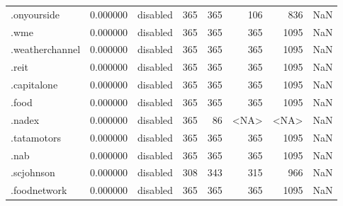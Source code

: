 \begin{tabular}{lrlrrrrl}
.onyourside               &          0.000000 &        disabled &                         365 &                         365 &                         106 &                 836 &                  NaN \\
.wme                      &          0.000000 &        disabled &                         365 &                         365 &                         365 &                1095 &                  NaN \\
.weatherchannel           &          0.000000 &        disabled &                         365 &                         365 &                         365 &                1095 &                  NaN \\
.reit                     &          0.000000 &        disabled &                         365 &                         365 &                         365 &                1095 &                  NaN \\
.capitalone               &          0.000000 &        disabled &                         365 &                         365 &                         365 &                1095 &                  NaN \\
.food                     &          0.000000 &        disabled &                         365 &                         365 &                         365 &                1095 &                  NaN \\
.nadex                    &          0.000000 &        disabled &                         365 &                          86 &                        <NA> &                <NA> &                  NaN \\
.tatamotors               &          0.000000 &        disabled &                         365 &                         365 &                         365 &                1095 &                  NaN \\
.nab                      &          0.000000 &        disabled &                         365 &                         365 &                         365 &                1095 &                  NaN \\
.scjohnson                &          0.000000 &        disabled &                         308 &                         343 &                         315 &                 966 &                  NaN \\
.foodnetwork              &          0.000000 &        disabled &                         365 &                         365 &                         365 &                1095 &                  NaN \\

\end{tabular}
